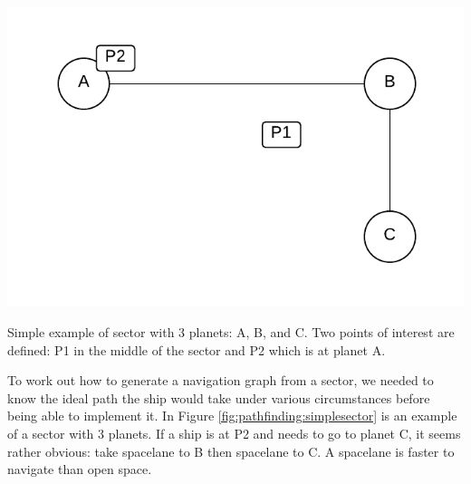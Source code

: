 \begin{marginfigure}
	\includegraphics{res/pathfinding/PathFindingSector.pdf}
	\caption[Simple example of sector]{Simple example of sector with 3 planets: A, B, and C. Two points of interest are defined: P1 in the middle of the sector and P2 which is at planet A.}
	\label{fig:pathfinding:simplesector}
\end{marginfigure}

To work out how to generate a navigation graph from a sector, we needed to know the ideal path the ship would take under various circumstances before being able to implement it.
In Figure \ref{fig:pathfinding:simplesector} is an example of a sector with 3 planets.
If a ship is at P2 and needs to go to planet C, it seems rather obvious: take spacelane to B then spacelane to C. 
A spacelane is faster to navigate than open space.

